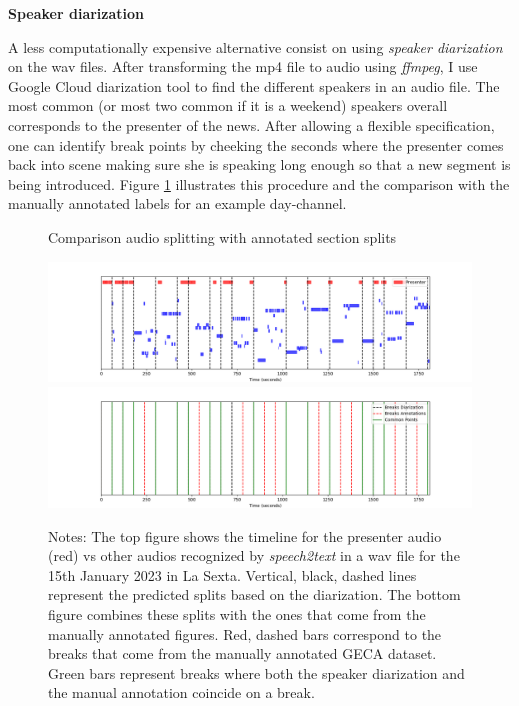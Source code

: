 \documentclass[12pt]{article}
\begin{document}
	
	
	
	\textbf{Speaker diarization}
	
	
	A less computationally expensive alternative consist on using \textit{speaker diarization} on the wav files. After transforming the mp4 file to audio using \textit{ffmpeg}, I use Google Cloud diarization tool to find the different speakers in an audio file. The most common (or most two common if it is a weekend) speakers overall corresponds to the presenter of the news. After allowing a flexible specification, one can identify break points by cheeking the seconds where the presenter comes back into scene making sure she is speaking long enough so that a new segment is being introduced. Figure \ref{fig:diarization} illustrates this procedure and the comparison with the manually annotated labels for an example day-channel.
	
	
	\begin{figure}[H]
		\centering
		\caption{Comparison audio splitting with annotated section splits}
		\includegraphics[width=120mm]{figures/speakers_all}
		\includegraphics[width=120mm]{figures/speaker_timeline}
		\caption*{\small Notes: The top figure shows the timeline for the presenter audio (red) vs other audios recognized by \textit{speech2text} in a wav file for the 15th January 2023 in La Sexta. Vertical, black, dashed lines represent the predicted splits based on the diarization. The bottom figure combines these splits with the ones that come from the manually annotated figures. Red, dashed bars correspond to the breaks that come from the manually annotated GECA dataset. Green bars represent breaks where both the speaker diarization and the manual annotation coincide on a break. }
		\label{fig:diarization}
	\end{figure}
	
	
	
	
	
	
	
	
	
	
	
	\clearpage
	
	
	
	
	
	
	
	
	
	
	
	
	
	
	
\end{document}
